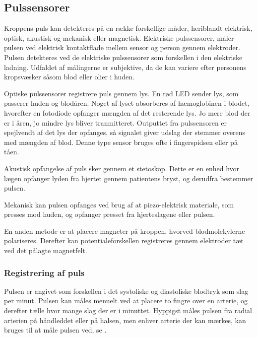 \subsection{Pulssensorer}
Kroppens puls kan detekteres på en række forskellige måder, heriblandt elektrisk, optisk, akustisk og mekanisk eller magnetisk.\cite{PhuaLissorguesMercier2009} 
\newline
Elektriske pulssensorer, måler pulsen ved elektrisk kontaktflade mellem sensor og person gennem elektroder. Pulsen detekteres ved de elektriske pulssensorer som forskellen i den elektriske ladning. Udfaldet af målingerne er subjektive, da de kan variere efter personens kropsvæsker såsom blod eller olier i huden.\cite{PhuaLissorguesMercier2009} 

Optiske pulssensorer registrere puls gennem lys. En rød LED sender lys, som passerer huden og blodåren. Noget af lyset absorberes af hæmoglobinen i blodet, hvorefter en fotodiode opfanger mængden af det resterende lys. Jo mere blod der er i åren, jo mindre lys bliver tranmitteret. Outputtet fra pulssensoren er spejlvendt af det lys der opfanges, så signalet giver udslag der stemmer overens med mængden af blod. Denne type sensor bruges ofte i fingerspidsen eller på tåen.\cite{PhuaLissorguesMercier2009,SrinivasReddySrinivas2006} 

Akustisk opfangelse af puls sker gennem et stetoskop. Dette er en enhed hvor lægen opfanger lyden fra hjertet gennem patientens bryst, og derudfra bestemmer pulsen.\cite{PhuaLissorguesMercier2009} 

Mekanisk kan pulsen opfanges ved brug af at piezo-elektrisk materiale, som presses mod huden, og opfanger presset fra hjerteslagene eller pulsen.\cite{PhuaLissorguesMercier2009} 

En anden metode er at placere magneter på kroppen, hvorved blodmolekylerne polariseres. Derefter kan potentialeforskellen registreres gennem elektroder tæt ved det pålagte magnetfelt.\cite{PhuaLissorguesMercier2009}

\subsubsection{Registrering af puls}
Pulsen er angivet som forskellen i det systoliske og diastoliske blodtryk som slag per minut. Pulsen kan måles menuelt ved at placere to fingre over en arterie, og derefter tælle hvor mange slag der er i minuttet. Hyppigst måles pulsen fra radial arterien på håndleddet eller på halsen, men enhver arterie der kan mærkes, kan bruges til at måle pulsen ved, se . 

